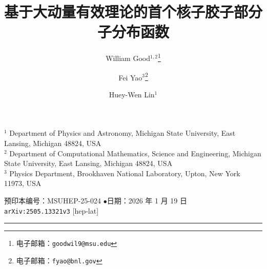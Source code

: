 \documentclass[11pt]{ctexart}
\title{\textbf{基于大动量有效理论的首个核子胶子部分子分布函数}}
\author{William Good$^{1,2}$\thanks{电子邮箱：\texttt{goodwil9@msu.edu}}
        \and Fei Yao$^{3}$\thanks{电子邮箱：\texttt{fyao@bnl.gov}}
        \and Huey-Wen Lin$^{1}$}
\date{}
\begin{document}
\maketitle
\vspace{-3.5em}
\begin{center}\small
$^{1}$ Department of Physics and Astronomy, Michigan State University,
East Lansing, Michigan 48824, USA\\[2pt]
$^{2}$ Department of Computational Mathematics, Science and Engineering,
Michigan State University, East Lansing, Michigan 48824, USA\\[2pt]
$^{3}$ Physics Department, Brookhaven National Laboratory,
Upton, New York 11973, USA
\end{center}
\vspace{0.6em}
\begin{center}\small
预印本编号：MSUHEP-25-024 \quad$\bullet$\quad 日期：2026 年 1 月 19 日\\
\texttt{arXiv:2505.13321v3} [hep-lat]
\end{center}
\noindent\rule{\textwidth}{0.4pt}












\end{document}

